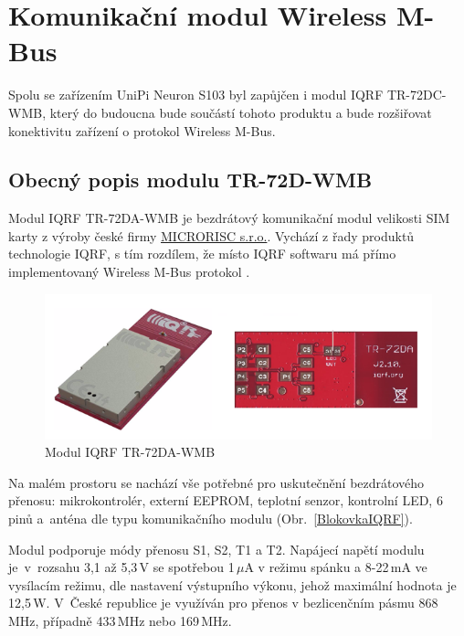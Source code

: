 \chapter{Komunikační modul Wireless M-Bus}
\label{ChapterKomunikacniModul}

Spolu se zařízením UniPi Neuron S103 byl zapůjčen i modul IQRF TR-72DC-WMB, který do budoucna bude součástí tohoto produktu a bude rozšiřovat konektivitu zařízení o protokol Wireless M-Bus. 

\section{Obecný popis modulu TR-72D-WMB}

Modul IQRF TR-72DA-WMB je bezdrátový komunikační modul velikosti SIM karty z výroby české firmy \href{http://microrisc.com/cs/}{MICRORISC s.r.o.}. Vychází z řady produktů technologie IQRF, s tím rozdílem, že místo IQRF softwaru má přímo implementovaný Wireless M-Bus protokol \cite{ModulIQRF}. 

 \begin{figure}[!ht]
\vspace{-1,pt}
  \begin{center}
    \includegraphics[scale=0.80]{obrazky/modul_modul}
  \end{center}
	\vspace{-20pt}
  \caption{Modul IQRF TR-72DA-WMB \cite{ModulIQRF}}
	\vspace{-10pt}
\end{figure}

Na malém prostoru se nachází vše potřebné pro uskutečnění bezdrátového přenosu: mikrokontrolér, externí EEPROM, teplotní senzor, kontrolní LED, 6 pinů a~anténa dle typu komunikačního modulu (Obr.~\ref{BlokovkaIQRF}).



Modul podporuje módy přenosu S1, S2, T1 a T2. Napájecí napětí modulu je~v~rozsahu 3,1 až 5,3\,V se spotřebou 1\,$\mu$A v režimu spánku a 8-22\,mA ve vysílacím režimu, dle nastavení výstupního výkonu, jehož maximální hodnota je 12,5\,W.
V~České republice je využíván pro přenos v bezlicenčním pásmu 868\,MHz, případně 433\,MHz nebo 169\,MHz.\newline


